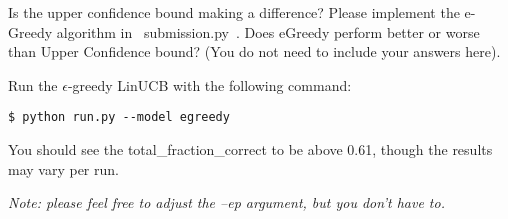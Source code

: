 \item {}

Is the upper confidence bound making a difference? Please implement the e-Greedy algorithm in ~submission.py~. Does eGreedy perform better or worse than Upper Confidence bound? (You do not need to include your answers here). 

Run the $\epsilon$-greedy LinUCB with the following command:

\begin{lstlisting}
$ python run.py --model egreedy
\end{lstlisting}

You should see the total\_fraction\_correct to be above 0.61, though the results may vary per run.

\textit{Note: please feel free to adjust the --ep argument, but you don't have to.}